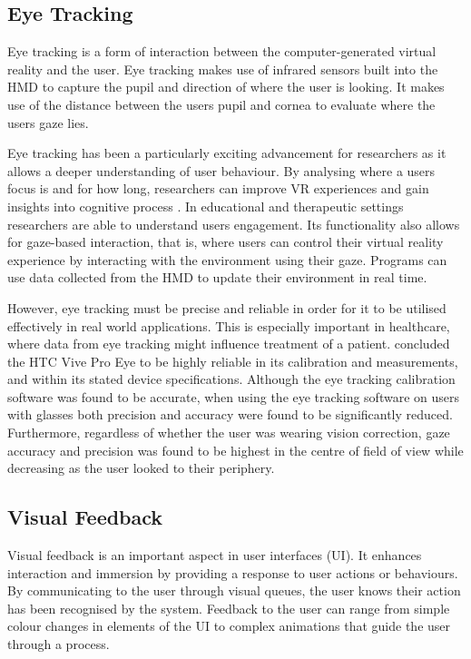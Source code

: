 \documentclass{l4proj}
\begin{document}
\subsection{Eye Tracking} \label{eye-tracking}
Eye tracking is a form of interaction between the computer-generated virtual reality and the user. Eye tracking makes use of infrared sensors built into the HMD to capture the pupil and direction of where the user is looking. It makes use of the distance between the users pupil and cornea to evaluate where the users gaze lies.

Eye tracking has been a particularly exciting advancement for researchers as it allows a deeper understanding of user behaviour. By analysing where a users focus is and for how long, researchers can improve VR experiences and gain insights into cognitive process \citep{Farnsworth2022VREyeTracking}. In educational and therapeutic settings researchers are able to understand users engagement. Its functionality also allows for gaze-based interaction, that is, where users can control their virtual reality experience by interacting with the environment using their gaze. Programs can use data collected from the HMD to update their environment in real time.

However, eye tracking must be precise and reliable in order for it to be utilised effectively in real world applications. This is especially important in healthcare, where data from eye tracking might influence treatment of a patient. \citet{SchuetzFiehler2022} concluded the HTC Vive Pro Eye to be highly reliable in its calibration and measurements, and within its stated device specifications. Although the eye tracking calibration software was found to be accurate, when using the eye tracking software on users with glasses both precision and accuracy were found to be significantly reduced. Furthermore, regardless of whether the user was wearing vision correction, gaze accuracy and precision was found to be highest in the centre of field of view while decreasing as the user looked to their periphery. 

\subsection{Visual Feedback}
Visual feedback is an important aspect in user interfaces (UI). It enhances interaction and immersion by providing a response to user actions or behaviours. By communicating to the user through visual queues, the user knows their action has been recognised by the system. Feedback to the user can range from simple colour changes in elements of the UI to complex animations that guide the user through a process.
\end{document}
